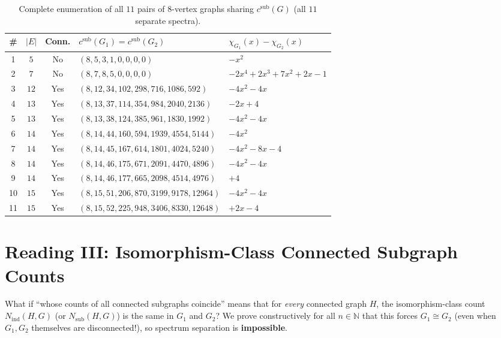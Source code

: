 \documentclass[11pt]{article}
\theoremstyle{definition}
\newcommand{\csub}{c^{\mathrm{sub}}}
\newcommand{\Nind}{N_{\mathrm{ind}}}
\newcommand{\Nsub}{N_{\mathrm{sub}}}
\begin{document}
\begin{table}[ht]
\centering
\footnotesize
\caption{Complete enumeration of all $11$ pairs of $8$-vertex graphs sharing $\csub(G)$ (all $11$ separate spectra).}
\label{tab:n8-csub}
\begin{tabular}{@{}cccll@{}}
\toprule
\textbf{\#} & $|E|$ & \textbf{Conn.} & $\csub(G_1) = \csub(G_2)$ & $\chi_{G_1}(x) - \chi_{G_2}(x)$ \\
\midrule
1 & $5$ & No & $(8, 5, 3, 1, 0, 0, 0, 0)$ & $-x^2$ \\
2 & $7$ & No & $(8, 7, 8, 5, 0, 0, 0, 0)$ & $-2x^4 + 2x^3 + 7x^2 + 2x - 1$ \\
3 & $12$ & Yes & $(8, 12, 34, 102, 298, 716, 1086, 592)$ & $-4x^2 - 4x$ \\
4 & $13$ & Yes & $(8, 13, 37, 114, 354, 984, 2040, 2136)$ & $-2x + 4$ \\
5 & $13$ & Yes & $(8, 13, 38, 124, 385, 961, 1830, 1992)$ & $-4x^2 - 4x$ \\
6 & $14$ & Yes & $(8, 14, 44, 160, 594, 1939, 4554, 5144)$ & $-4x^2$ \\
7 & $14$ & Yes & $(8, 14, 45, 167, 614, 1801, 4024, 5240)$ & $-4x^2 - 8x - 4$ \\
8 & $14$ & Yes & $(8, 14, 46, 175, 671, 2091, 4470, 4896)$ & $-4x^2 - 4x$ \\
9 & $14$ & Yes & $(8, 14, 46, 177, 665, 2098, 4514, 4976)$ & $+4$ \\
10 & $15$ & Yes & $(8, 15, 51, 206, 870, 3199, 9178, 12964)$ & $-4x^2 - 4x$ \\
11 & $15$ & Yes & $(8, 15, 52, 225, 948, 3406, 8330, 12648)$ & $+2x - 4$ \\
\bottomrule
\end{tabular}
\end{table}

\section{Reading III: Isomorphism-Class Connected Subgraph Counts}

What if ``whose counts of all connected subgraphs coincide'' means that for \emph{every} connected graph $H$, the isomorphism-class count $\Nind(H, G)$ (or $\Nsub(H, G)$) is the same in $G_1$ and $G_2$? We prove constructively for all $n \in \mathbb{N}$ that this forces $G_1 \cong G_2$ (even when $G_1, G_2$ themselves are disconnected!), so spectrum separation is \textbf{impossible}.
\end{document}

